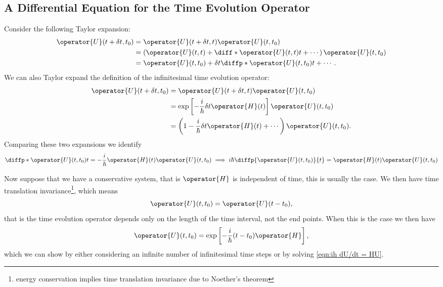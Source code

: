 \documentclass[fleqn]{NotesClass}
\begin{document}
    \subsection{A Differential Equation for the Time Evolution Operator}
    Consider the following Taylor expansion:
    \begin{align}
        \operator{U}(t + \delta t, t_0) &= \operator{U}(t + \delta t, t)\operator{U}(t, t_0)\\
        &= \left( \operator{U}(t, t) + \diff*{\operator{U}(t, t)}{t} + \dotsb \right)\operator{U}(t, t_0)\\
        &= \operator{U}(t, t_0) + \delta t \diffp*{\operator{U}(t, t_0)}{t} + \dotsb.
    \end{align}
    We can also Taylor expand the definition of the infinitesimal time evolution operator:
    \begin{align}
        \operator{U}(t + \delta t, t_0) &= \operator{U}(t + \delta t, t)\operator{U}(t, t_0)\\
        &= \exp\left[ -\frac{i}{\hbar}\delta t\operator{H}(t) \right] \operator{U}(t, t_0)\\
        &= \left( 1 - \frac{i}{\hbar}\delta t \operator{H}(t) + \dotsb \right) \operator{U}(t, t_0).
    \end{align}
    Comparing these two expansions we identify
    \begin{equation}\label{eqn:ih dU/dt = HU}
        \diffp*{\operator{U}(t, t_0)}{t} = -\frac{i}{\hbar} \operator{H}(t) \operator{U}(t, t_0) \implies i\hbar\diffp{\operator{U}(t, t_0)}{t} = \operator{H}(t)\operator{U}(t, t_0)
    \end{equation}
    
    Now suppose that we have a conservative system, that is \(\operator{H}\) is independent of time, this is usually the case.
    We then have time translation invariance\footnote{energy conservation implies time translation invariance due to Noether's theorem}, which means
    \begin{equation}
        \operator{U}(t, t_0) = \operator{U}(t - t_0),
    \end{equation}
    that is the time evolution operator depends only on the length of the time interval, not the end points.
    When this is the case we then have
    \begin{equation}
        \operator{U}(t, t_0) = \exp\left[ -\frac{i}{\hbar}(t - t_0)\operator{H} \right],
    \end{equation}
    which we can show by either considering an infinite number of infinitesimal time steps or by solving \cref{eqn:ih dU/dt = HU}.
    
\end{document}
